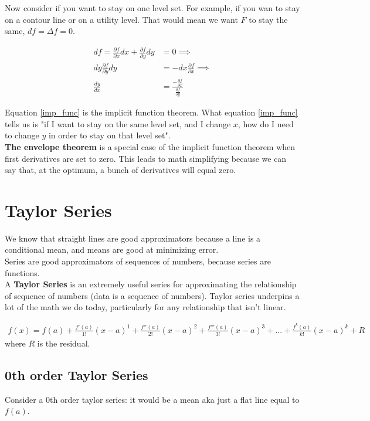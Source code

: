 \documentclass{article}
\begin{document}
Now consider if you want to stay on one level set. For example, if you wan to stay on a contour line or on a utility level. That would mean we want $F$ to stay the same, $df = \Delta f = 0$. 

\begin{align}
    d f = \frac{\partial f}{\partial x} dx + \frac{\partial f}{\partial y} dy &= 0 \implies \\
    dy \frac{\partial f}{\partial y} dy &= - dx \frac{\partial f}{\partial x} \implies \\
    \frac{d y}{dx} &= \frac{- \frac{\partial f}{\partial x}}{\frac{\partial f}{\partial y}} \label{imp_func}
\end{align}

Equation \ref{imp_func} is the implicit function theorem. What equation \ref{imp_func} tells us is "if I want to stay on the same level set, and I change $x$, how do I need to change $y$ in order to stay on that level set".\\


\textbf{The envelope theorem} is a special case of the implicit function theorem when first derivatives are set to zero. This leads to math simplifying because we can say that, at the optimum, a bunch of derivatives will equal zero. 

\section{Taylor Series}

We know that straight lines are good approximators because a line is a conditional mean, and means are good at minimizing error.\\

Series are good approximators of sequences of numbers, because series are functions. \\

A \textbf{Taylor Series} is an extremely useful series for approximating the relationship of sequence of numbers (data is a sequence of numbers). Taylor series underpins a lot of the math we do today, particularly for any relationship that isn't linear. 

\begin{align}
    f(x) = f(a) + \frac{f'(a)}{1!}(x-a)^1 + \frac{f''(a)}{2!}(x-a)^2 + \frac{f'''(a)}{3!}(x-a)^3 + ... + \frac{f^k(a)}{k!}(x-a)^k + R
\end{align}
where $R$ is the residual.\\


\subsection{0th order Taylor Series}
Consider a 0th order taylor series: it would be a mean aka just a flat line equal to $f(a)$. \\
\end{document}
